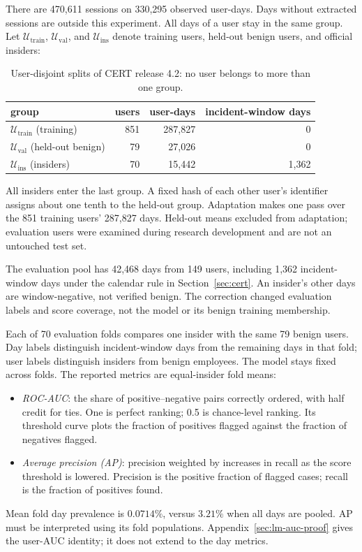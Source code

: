 \documentclass[12pt]{report}
\begin{document}
There are 470,611 sessions on 330,295 observed user-days.
Days without extracted sessions are outside this experiment.
All days of a user stay in the same group. Let
$\mathcal U_{\mathrm{train}}$, $\mathcal U_{\mathrm{val}}$, and
$\mathcal U_{\mathrm{ins}}$ denote training users, held-out benign
users, and official insiders:
\begin{table}[!htbp]
\centering
\caption{User-disjoint splits of CERT release 4.2: no user belongs to more than
one group.}
\label{tab:splits}
\begin{tabular}{lrrr}
\toprule
group & users & user-days & incident-window days \\
\midrule
$\mathcal{U}_{\mathrm{train}}$ (training) & 851 & 287,827 & 0 \\
$\mathcal{U}_{\mathrm{val}}$ (held-out benign) & 79 & 27,026 & 0 \\
$\mathcal{U}_{\mathrm{ins}}$ (insiders) & 70 & 15,442 & 1,362 \\
\bottomrule
\end{tabular}
\end{table}
All insiders enter the last group. A fixed hash of each other user's
identifier assigns about one tenth to the held-out group. Adaptation
makes one pass over the 851 training users' 287,827 days.
Held-out means excluded from adaptation; evaluation users were
examined during research development and are not an untouched test set.

The evaluation pool has 42,468 days from 149 users, including 1,362
incident-window days under the calendar rule in Section~\ref{sec:cert}.
An insider's other days are window-negative, not verified benign.
The correction changed evaluation labels and score coverage, not
the model or its benign training membership.

\label{sec:lm-auc}
Each of 70 evaluation folds compares one insider with the same
79 benign users. Day labels distinguish incident-window days from
the remaining days in that fold; user labels distinguish insiders
from benign employees. The model stays fixed across folds.
The reported metrics are equal-insider fold means:
\begin{itemize}
\item \emph{ROC-AUC}: the share of positive--negative pairs correctly
ordered, with half credit for ties. One is perfect ranking; 0.5 is
chance-level ranking. Its threshold curve plots the fraction of positives
flagged against the fraction of negatives flagged.
\item \emph{Average precision (AP)}: precision weighted by increases
in recall as the score threshold is lowered. Precision is the positive
fraction of flagged cases; recall is the fraction of positives found.
\end{itemize}
Mean fold day prevalence is $0.0714\%$, versus $3.21\%$ when all days
are pooled. AP must be interpreted using its fold populations.
Appendix~\ref{sec:lm-auc-proof} gives the user-AUC identity; it does not
extend to the day metrics.
\end{document}
